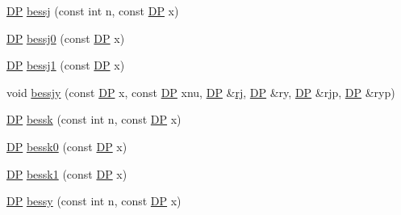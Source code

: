 \begin{DoxyCompactItemize}
\item 
\mbox{\hyperlink{namespaceNR_af6ff762dd605ff477b8e52387253a02a}{DP}} \mbox{\hyperlink{namespaceNR_a92c1165db5f7c1972279d98ef34037d0}{bessj}} (const int n, const \mbox{\hyperlink{namespaceNR_af6ff762dd605ff477b8e52387253a02a}{DP}} x)
\item 
\mbox{\hyperlink{namespaceNR_af6ff762dd605ff477b8e52387253a02a}{DP}} \mbox{\hyperlink{namespaceNR_ac93cd7e7156598f76f6bb6de2833c776}{bessj0}} (const \mbox{\hyperlink{namespaceNR_af6ff762dd605ff477b8e52387253a02a}{DP}} x)
\item 
\mbox{\hyperlink{namespaceNR_af6ff762dd605ff477b8e52387253a02a}{DP}} \mbox{\hyperlink{namespaceNR_a4115607a7ec9c7f9120010c2b95828bb}{bessj1}} (const \mbox{\hyperlink{namespaceNR_af6ff762dd605ff477b8e52387253a02a}{DP}} x)
\item 
void \mbox{\hyperlink{namespaceNR_a1d4131e07fae6eb514a9c163b52e0c04}{bessjy}} (const \mbox{\hyperlink{namespaceNR_af6ff762dd605ff477b8e52387253a02a}{DP}} x, const \mbox{\hyperlink{namespaceNR_af6ff762dd605ff477b8e52387253a02a}{DP}} xnu, \mbox{\hyperlink{namespaceNR_af6ff762dd605ff477b8e52387253a02a}{DP}} \&\mbox{\hyperlink{namespaceNR_ac238786569e5bffe3268ad64d2a45636}{rj}}, \mbox{\hyperlink{namespaceNR_af6ff762dd605ff477b8e52387253a02a}{DP}} \&ry, \mbox{\hyperlink{namespaceNR_af6ff762dd605ff477b8e52387253a02a}{DP}} \&rjp, \mbox{\hyperlink{namespaceNR_af6ff762dd605ff477b8e52387253a02a}{DP}} \&ryp)
\item 
\mbox{\hyperlink{namespaceNR_af6ff762dd605ff477b8e52387253a02a}{DP}} \mbox{\hyperlink{namespaceNR_a40c43ba6abef517ca55293673c417584}{bessk}} (const int n, const \mbox{\hyperlink{namespaceNR_af6ff762dd605ff477b8e52387253a02a}{DP}} x)
\item 
\mbox{\hyperlink{namespaceNR_af6ff762dd605ff477b8e52387253a02a}{DP}} \mbox{\hyperlink{namespaceNR_ad7a01f8ec189b154d56f9c82617d9991}{bessk0}} (const \mbox{\hyperlink{namespaceNR_af6ff762dd605ff477b8e52387253a02a}{DP}} x)
\item 
\mbox{\hyperlink{namespaceNR_af6ff762dd605ff477b8e52387253a02a}{DP}} \mbox{\hyperlink{namespaceNR_a78b14863c0539fb70061775456e35d08}{bessk1}} (const \mbox{\hyperlink{namespaceNR_af6ff762dd605ff477b8e52387253a02a}{DP}} x)
\item 
\mbox{\hyperlink{namespaceNR_af6ff762dd605ff477b8e52387253a02a}{DP}} \mbox{\hyperlink{namespaceNR_a470fb46ac0e710eae347c1137b1ebfb8}{bessy}} (const int n, const \mbox{\hyperlink{namespaceNR_af6ff762dd605ff477b8e52387253a02a}{DP}} x)
\item 

\end{DoxyCompactItemize}
